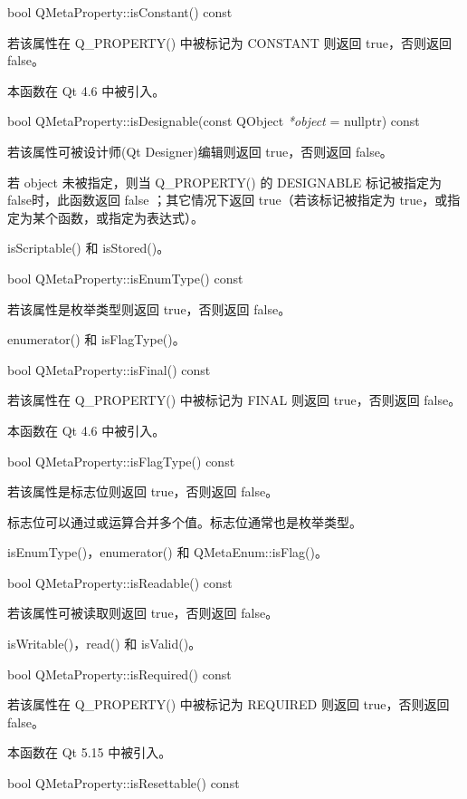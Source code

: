 bool QMetaProperty::isConstant() const

若该属性在 Q\_PROPERTY() 中被标记为 CONSTANT 则返回 true，否则返回 false。

本函数在 Qt 4.6 中被引入。

bool QMetaProperty::isDesignable(const QObject \emph{*object} = nullptr) const

若该属性可被设计师(Qt Designer)编辑则返回 true，否则返回 false。

若 object 未被指定，则当 Q\_PROPERTY() 的 DESIGNABLE 标记被指定为 false时，此函数返回 false ；其它情况下返回 true（若该标记被指定为 true，或指定为某个函数，或指定为表达式）。

\begin{seeAlso}
isScriptable() 和 isStored()。
\end{seeAlso}

bool QMetaProperty::isEnumType() const

若该属性是枚举类型则返回 true，否则返回 false。

\begin{seeAlso}
enumerator() 和 isFlagType()。
\end{seeAlso}

bool QMetaProperty::isFinal() const

若该属性在 Q\_PROPERTY() 中被标记为 FINAL 则返回 true，否则返回 false。

本函数在 Qt 4.6 中被引入。

bool QMetaProperty::isFlagType() const

若该属性是标志位则返回 true，否则返回 false。

标志位可以通过或运算合并多个值。标志位通常也是枚举类型。

\begin{seeAlso}
isEnumType()，enumerator() 和 QMetaEnum::isFlag()。
\end{seeAlso}

bool QMetaProperty::isReadable() const

若该属性可被读取则返回 true，否则返回 false。

\begin{seeAlso}
isWritable()，read() 和 isValid()。
\end{seeAlso}

bool QMetaProperty::isRequired() const

若该属性在 Q\_PROPERTY() 中被标记为 REQUIRED 则返回 true，否则返回 false。

本函数在 Qt 5.15 中被引入。

bool QMetaProperty::isResettable() const

